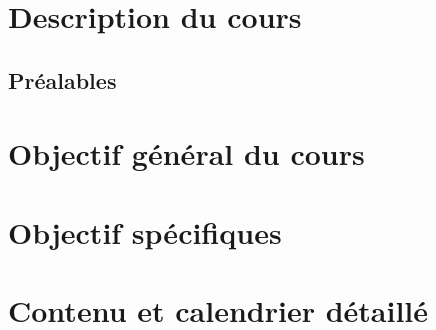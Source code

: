 \documentclass[12pt,undergraduate]{uqtrplandecours}
\begin{document}
\maketitle

\section{Description du cours}

\lipsum[1]


\subsection*{Préalables}

\lipsum[2]

\section{Objectif général du cours}

\lipsum[3]

\section{Objectif spécifiques}

\lipsum[4]


\clearpage
\section{Contenu et calendrier détaillé}

\nextclass


\nextclass


\nextclass


\nextclass
{}

\nextclass
{}

\nextclass
{}
\end{document}
